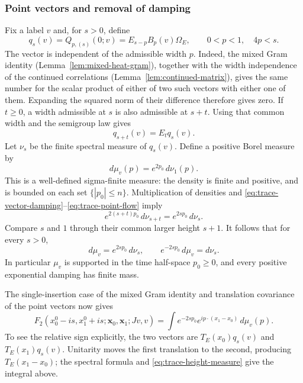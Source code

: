 \subsubsection{Point vectors and removal of damping}
Fix a label $v$ and, for $s>0$, define
\[
 q_s(v)=Q_{p,(s)}(0;v)=E_{s-p}B_p(v)\Omega_E,
 \qquad 0<p<1,\quad4p<s.
\]
The vector is independent of the admissible width $p$. Indeed, the mixed
Gram identity (Lemma~\ref{lem:mixed-heat-gram}), together with the
width independence of the continued correlations
(Lemma~\ref{lem:continued-matrix}), gives the same number for the scalar product of either of
two such vectors with either one of them. Expanding the squared norm of
their difference therefore gives zero. If $t\geq0$, a width admissible
at $s$ is also admissible at $s+t$. Using that common width and the
semigroup law gives
\begin{equation}\label{eq:trace-point-flow}
 q_{s+t}(v)=E_tq_s(v).
\end{equation}
Let $\nu_s$ be the finite spectral measure of $q_s(v)$. Define a positive
Borel measure by
\begin{equation}\label{eq:trace-undamping}
 d\mu_v(p)=e^{2p_0}\,d\nu_1(p).
\end{equation}
This is a well-defined sigma-finite measure: the density is finite and
positive, and is bounded on each set $\{|p_0|\leq n\}$.
Multiplication of densities and
\eqref{eq:trace-vector-damping}--\eqref{eq:trace-point-flow} imply
\[
 e^{2(s+t)p_0}\,d\nu_{s+t}=e^{2sp_0}\,d\nu_s.
\]
Compare $s$ and $1$ through their common larger height $s+1$. It follows
that for every $s>0$,
\begin{equation}\label{eq:trace-height-measure}
 d\mu_v=e^{2sp_0}\,d\nu_s,
 \qquad e^{-2sp_0}\,d\mu_v=d\nu_s.
\end{equation}
In particular $\mu_v$ is supported in the time half-space $p_0\geq0$,
and every positive exponential damping has finite mass.

The single-insertion case of the mixed Gram identity and translation
covariance of the point vectors now gives
\begin{equation}\label{eq:trace-pair-laplace}
 F_2(x_0^0-is,x_1^0+is;\mathbf x_0,\mathbf x_1;Jv,v)
 =\int e^{-2sp_0}e^{ip\cdot(x_1-x_0)}\,d\mu_v(p).
\end{equation}
To see the relative sign explicitly, the two vectors are
$T_E(x_0)q_s(v)$ and $T_E(x_1)q_s(v)$. Unitarity moves the first
translation to the second, producing $T_E(x_1-x_0)$; the spectral formula
and \eqref{eq:trace-height-measure} give the integral above.

